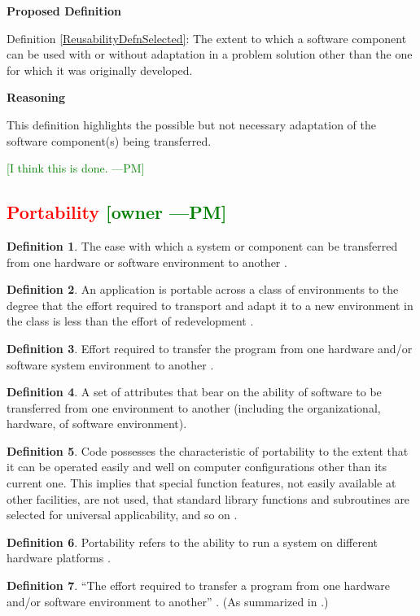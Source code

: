 \documentclass[letterpaper,cleveref]{lipics-v2019}
\newcommand{\authornote}[3]{\textcolor{#1}{[#3 ---#2]}}
\newcommand{\authornote}[3]{}
\newcommand{\pmi}[1]{\authornote{green}{PM}{#1}} %
\newcommand{\notdone}[1]{\textcolor{red}{#1}}
\theoremstyle{definition}
\newtheorem{defn}{Definition}
\begin{document}
\noindent \textbf{Proposed Definition}

Definition \ref{ReusabilityDefnSelected}: The extent to which a software
component can be used with or without adaptation in a problem solution other
than the one for which it was originally developed.

\noindent \textbf{Reasoning}

This definition highlights the possible but not necessary adaptation of the
software component(s) being transferred.

\pmi{I think this is done.}

\subsection{\notdone{Portability} \pmi{owner}}
\begin{defn}
The ease with which a system or component can be transferred from one hardware
or software environment to another \citep{IEEEStdGlossarySET1990}.
\end{defn}
\begin{defn}
An application is portable across a class of environments to the degree that the
effort required to transport and adapt it to a new environment in the class is
less than the effort of redevelopment \citep{mooney1990strategies}.
\end{defn}
\begin{defn} \label{PortabilityDefnSelected}
Effort required to transfer the program from one hardware and/or software system
environment to another \citep{pressman2005software}.
\end{defn}
\begin{defn}
A set of attributes that bear on the ability of software to be transferred from
one environment to another (including the organizational, hardware, of software
environment)\citep{pfleeger2006software}.
\end{defn}
\begin{defn}
Code possesses the characteristic of portability to the extent that it can be
operated easily and well on computer configurations other than its current
one. This implies that special function features, not easily available at other
facilities, are not used, that standard library functions and subroutines are
selected for universal applicability, and so on \citep{boehm2007software}.
\end{defn}
\begin{defn}
Portability refers to the ability to run a system on different hardware
platforms \citep{ghezzi1991fundamentals}.
\end{defn}
\begin{defn}
  ``The effort required to transfer a program from one hardware and/or software
  environment to another'' \citep{McCallEtAl1977}. (As summarized in
  \citet{VanVliet2000}.)
\end{defn}
\end{document}
